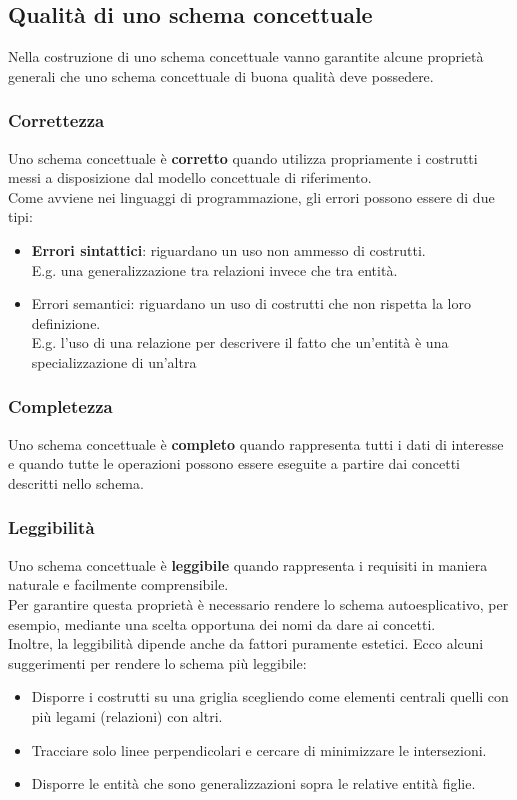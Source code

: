 \subsection{Qualità di uno schema concettuale}
Nella costruzione di uno schema concettuale vanno garantite alcune proprietà generali che uno schema concettuale di buona qualità deve possedere.

\subsubsection{Correttezza}
Uno schema concettuale è \textbf{corretto} quando utilizza propriamente i costrutti messi a disposizione dal modello concettuale di riferimento.\\
Come avviene nei linguaggi di programmazione, gli errori possono essere di due tipi:
    \begin{itemize}
        \item{\textbf{Errori sintattici}: riguardano un uso non ammesso di costrutti.\\
        E.g. una generalizzazione tra relazioni invece che tra entità.}
        \item{{Errori semantici}: riguardano un uso di costrutti che non rispetta la loro definizione.\\
        E.g. l'uso di una relazione per descrivere il fatto che un'entità è una specializzazione di un'altra}
    \end{itemize}
    
\subsubsection{Completezza}
Uno schema concettuale è \textbf{completo} quando rappresenta tutti i dati di interesse e quando tutte le operazioni possono essere eseguite a partire dai concetti descritti nello schema.

\subsubsection{Leggibilità}
Uno schema concettuale è \textbf{leggibile} quando rappresenta i requisiti in maniera naturale e facilmente comprensibile.\\
Per garantire questa proprietà è necessario rendere lo schema autoesplicativo, per esempio, mediante una scelta opportuna dei nomi da dare ai concetti.\\
Inoltre, la leggibilità dipende anche da fattori puramente estetici. Ecco alcuni suggerimenti per rendere lo schema più leggibile:
    \begin{itemize}
        \item{Disporre i costrutti su una griglia scegliendo come elementi centrali quelli con più legami (relazioni) con altri.}
        \item{Tracciare solo linee perpendicolari e cercare di minimizzare le intersezioni.}
        \item{Disporre le entità che sono generalizzazioni sopra le relative entità figlie.}
    \end{itemize}
    
